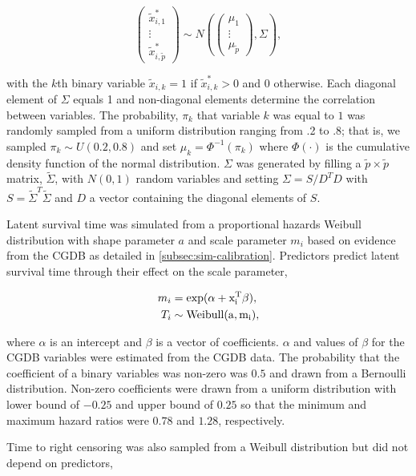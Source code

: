 \documentclass[11pt,final,fleqn]{article}\usepackage[]{graphicx}\usepackage[]{color}
\theoremstyle{plain}
\begin{document}
\begin{equation}
\begin{pmatrix}
\tilde{x}_{i,1}^{*} \\
\vdots \\
\tilde{x}_{i,\tilde{p}}^{*}
\end{pmatrix}
\sim
N
\left(\begin{pmatrix}
\mu_{1} \\
\vdots \\
\mu_{\tilde{p}}
\end{pmatrix},
\Sigma
\right),
\end{equation}

with the $k$th binary variable $\tilde{x}_{i,k}=1$ if $\tilde{x}_{i,k}^{*} > 0$ and $0$ otherwise. Each diagonal element of $\Sigma$ equals 1 and non-diagonal elements determine the correlation between variables. The probability, $\pi_k$ that  variable $k$ was equal to $1$ was randomly sampled from a uniform distribution ranging from .2 to .8; that is, we sampled $\pi_k \sim U(0.2, 0.8)$ and set $\mu_k = \Phi^{-1}(\pi_k)$ where $\Phi(\cdot)$ is the cumulative density function of the normal distribution. $\Sigma$ was generated by filling a $\tilde{p} \times \tilde{p}$ matrix, $\tilde{\Sigma}$, with $N(0,1)$ random variables and setting  $\Sigma = S/D^TD$ with $S = \tilde{\Sigma}^T\tilde{\Sigma}$ and $D$ a vector containing the diagonal elements of $S$. 

Latent survival time was simulated from a proportional hazards Weibull distribution with shape parameter $a$ and scale parameter $m_i$ based on evidence from the CGDB as detailed in \autoref{subsec:sim-calibration}. Predictors predict latent survival time through their effect on the scale parameter,

\begin{align} 
m_i &= \rm{exp}(\alpha + x_i^T\beta), \\
T_i &\sim \rm{Weibull}(a, m_i),
\end{align} 

where $\alpha$ is an intercept and $\beta$ is a vector of coefficients. $\alpha$ and values of $\beta$ for the CGDB variables were estimated from the CGDB data. The probability that the coefficient of a binary variables was non-zero was $0.5$ and drawn from a Bernoulli distribution. Non-zero coefficients were drawn from a uniform distribution with lower bound of $-0.25$ and upper bound of $0.25$ so that the minimum and maximum hazard ratios were $0.78$ and $1.28$, respectively. 

Time to right censoring was also sampled from a Weibull distribution but did not depend on predictors, 
\end{document}
